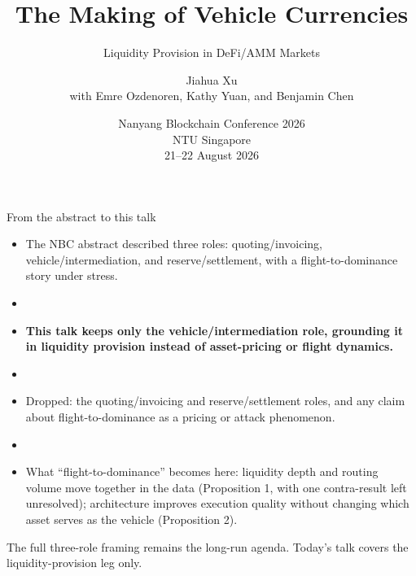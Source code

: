\documentclass[aspectratio=169]{beamer}
\title[Vehicle Currencies in DeFi]{The Making of Vehicle Currencies}
\subtitle{Liquidity Provision in DeFi/AMM Markets}
\author[J.~Xu et al.]{Jiahua Xu \\ {\small with Emre Ozdenoren, Kathy Yuan, and Benjamin Chen}}
\institute{UCL Centre for Blockchain Technologies}
\date{Nanyang Blockchain Conference 2026 \\ NTU Singapore \\ 21--22 August 2026}
\begin{document}
\begin{frame}
  \titlepage
\end{frame}

\begin{frame}{From the abstract to this talk}
  \begin{itemize}
    \item The NBC abstract described three roles: quoting/invoicing, vehicle/intermediation, and reserve/settlement, with a flight-to-dominance story under stress.
    \item[] \vspace{-0.3em}
    \item \textbf{This talk keeps only the vehicle/intermediation role, grounding it in liquidity provision instead of asset-pricing or flight dynamics.}
    \item[] \vspace{-0.3em}
    \item Dropped: the quoting/invoicing and reserve/settlement roles, and any claim about flight-to-dominance as a pricing or attack phenomenon.
    \item[] \vspace{-0.3em}
    \item What ``flight-to-dominance'' becomes here: liquidity depth and routing volume move together in the data (Proposition 1, with one contra-result left unresolved); architecture improves execution quality without changing which asset serves as the vehicle (Proposition 2).
  \end{itemize}
  \vfill
  {\scriptsize The full three-role framing remains the long-run agenda. Today's talk covers the liquidity-provision leg only.}
\end{frame}
\end{document}
